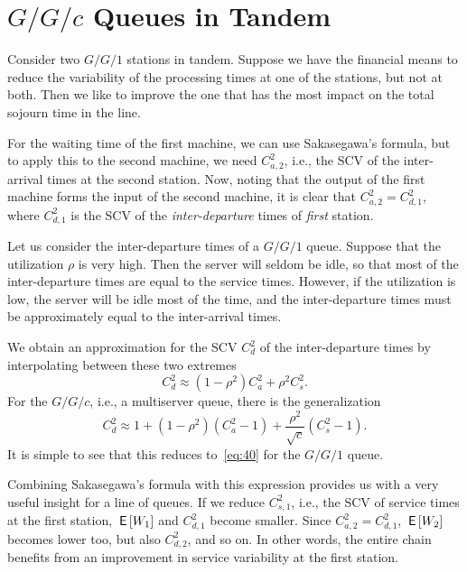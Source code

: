 \documentclass[stochastic-or.tex]{subfiles}
\begin{document}
\section{\texorpdfstring{$G/G/c$}{GGc} Queues in Tandem}
\label{sec:tandem-queues}


Consider two $G/G/1$ stations in tandem.
Suppose we have the financial means to reduce the variability of the processing times at  one of the stations, but not at both.
Then we like to improve the one that has the most impact on the total sojourn time in the line.

For the waiting time of the first machine, we can use Sakasegawa's formula, but to apply this to the second machine, we need $C^2_{a,2}$, i.e., the SCV of the inter-arrival times at the second station.
Now, noting that the output of the first machine forms the input of the second machine, it is clear that $C^2_{a,2}=C^2_{d,1}$, where $C^2_{d,1}$ is the SCV of the \emph{inter-departure} times of \emph{first} station.


Let us consider the inter-departure times of a $G/G/1$ queue.
Suppose that the  utilization $\rho$ is very high.
Then the server will seldom be idle, so that most of the inter-departure times are equal to the service times.
However, if the utilization is low, the server will be idle most of the time, and the inter-departure times must be approximately equal to the inter-arrival times.

We obtain an  approximation for the SCV $C_{d}^2$ of the inter-departure times by  interpolating between these two extremes
\begin{equation} \label{eq:40}
 C_{d}^2 \approx  (1-\rho^2) C_{a}^2 + \rho^2 C_{s}^2.
\end{equation}
For the $G/G/c$, i.e., a multiserver queue, there is the generalization
\begin{equation*}
 C_{d}^2 \approx 1 + (1-\rho^2)(C_{a}^2-1) + \frac{\rho^2}{\sqrt{c}}(C_{s}^2-1).
\end{equation*}
It is simple to see that this reduces to~\cref{eq:40} for the $G/G/1$ queue.

Combining Sakasegawa's formula with this expression provides us with a very useful insight for a line of queues.
If we reduce $C^2_{s,1}$, i.e., the SCV of service times at the first station, $\,\mathsf{E}\left[W_1\right]$ and $C^2_{d,1}$ become smaller.
Since $C^2_{a,2}=C^2_{d,1}$, $\,\mathsf{E}\left[W_2\right]$ becomes lower too, but also $C^2_{d,2}$, and so on.
In other words, the entire chain benefits from an improvement in service variability at the first station.
\end{document}
